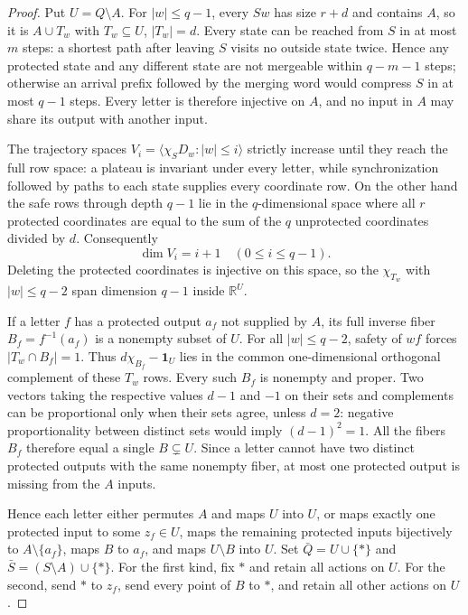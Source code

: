 \documentclass[10pt]{article}
\begin{document}
\begin{proof}
Put $U=Q\setminus A$. For $|w|\le q-1$, every $Sw$ has
size $r+d$ and contains $A$, so it is $A\cup T_w$ with
$T_w\subseteq U$, $|T_w|=d$. Every state can be reached
from $S$ in at most $m$ steps: a shortest path after leaving
$S$ visits no outside state twice. Hence any protected state and
any different state are not mergeable within $q-m-1$ steps;
otherwise an arrival prefix followed by the merging word would
compress $S$ in at most $q-1$ steps. Every letter is therefore
injective on $A$, and no input in $A$ may share its output with
another input.

The trajectory spaces $V_i=\langle\chi_SD_w:|w|\le i\rangle$
strictly increase until they reach the full row space: a plateau
is invariant under every letter, while synchronization followed
by paths to each state supplies every coordinate row. On the
other hand the safe rows through depth $q-1$ lie in the
$q$-dimensional space where all $r$ protected coordinates are
equal to the sum of the $q$ unprotected coordinates divided by $d$.
Consequently
\[
 \dim V_i=i+1\quad(0\le i\le q-1).
\]
Deleting the protected coordinates is injective on this space, so
the $\chi_{T_w}$ with $|w|\le q-2$ span dimension $q-1$
inside $\mathbb R^U$.

If a letter $f$ has a protected output $a_f$ not supplied by $A$,
its full inverse fiber $B_f=f^{-1}(a_f)$ is a nonempty subset of $U$.
For all $|w|\le q-2$, safety of $wf$ forces $|T_w\cap B_f|=1$.
Thus $d\chi_{B_f}-\mathbf1_U$ lies in the common one-dimensional
orthogonal complement of these $T_w$ rows. Every such $B_f$ is
nonempty and proper. Two vectors taking the respective values
$d-1$ and $-1$ on their sets and complements can be proportional
only when their sets agree, unless $d=2$: negative proportionality
between distinct sets would imply $(d-1)^2=1$. All the fibers
$B_f$ therefore equal a single $B\subsetneq U$. Since a letter
cannot have two distinct protected outputs with the same nonempty
fiber, at most one protected output is missing from the $A$ inputs.

Hence each letter either permutes $A$ and maps $U$ into $U$, or
maps exactly one protected input to some $z_f\in U$, maps the
remaining protected inputs bijectively to $A\setminus\{a_f\}$,
maps $B$ to $a_f$, and maps $U\setminus B$ into $U$.
Set $\bar Q=U\cup\{*\}$ and
$\bar S=(S\setminus A)\cup\{*\}$. For the first kind,
fix $*$ and retain all actions on $U$. For the second,
send $*$ to $z_f$, send every point of $B$ to $*$, and
retain all other actions on $U$.


\end{proof}
\end{document}
